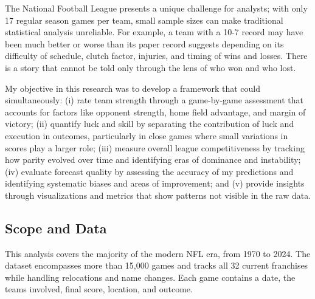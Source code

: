 \documentclass[a4paper,10.5pt,twoside]{article}
\begin{document}
The National Football League presents a unique challenge for analysts; with only 17 regular season games per team, small sample sizes can make traditional statistical analysis unreliable. For example, a team with a 10-7 record may have been much better or worse than its paper record suggests depending on its difficulty of schedule, clutch factor, injuries, and timing of wins and losses. There is a story that cannot be told only through the lens of who won and who lost.

My objective in this research was to develop a framework that could simultaneously: (i) rate team strength through a game-by-game assessment that accounts for factors like opponent strength, home field advantage, and margin of victory; (ii) quantify luck and skill by separating the contribution of luck and execution in outcomes, particularly in close games where small variations in scores play a larger role; (iii) measure overall league competitiveness by tracking how parity evolved over time and identifying eras of dominance and instability; (iv) evaluate forecast quality by assessing the accuracy of my predictions and identifying systematic biases and areas of improvement; and (v) provide insights through visualizations and metrics that show patterns not visible in the raw data.

\subsection{Scope and Data}

This analysis covers the majority of the modern NFL era, from 1970 to 2024. The dataset encompasses more than 15,000 games and tracks all 32 current franchises while handling relocations and name changes. Each game contains a date, the teams involved, final score, location, and outcome. 
\end{document}
